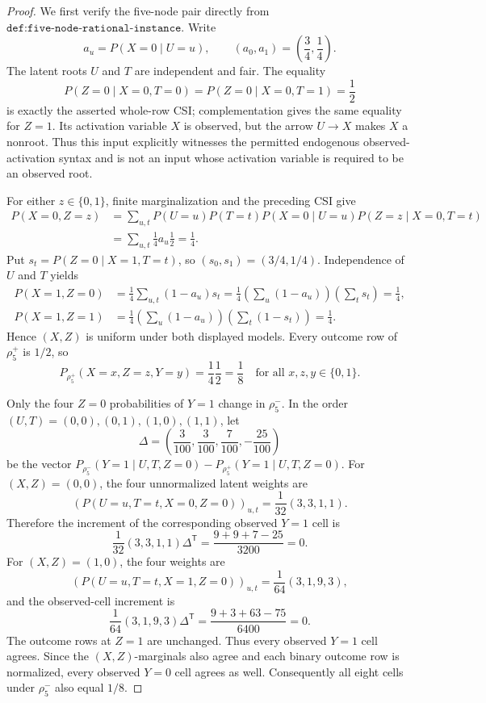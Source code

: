 \documentclass{article}
\begin{document}
\begin{proof}
We first verify the five-node pair directly from \(\texttt{def:five-node-rational-instance}\).  Write
\[
 a_u=P(X=0\mid U=u),\qquad (a_0,a_1)=\left(\frac34,\frac14\right).
\]
The latent roots \(U\) and \(T\) are independent and fair.  The equality
\[
 P(Z=0\mid X=0,T=0)=P(Z=0\mid X=0,T=1)=\frac12
\]
is exactly the asserted whole-row CSI; complementation gives the same equality for \(Z=1\).  Its activation variable \(X\) is observed, but the arrow \(U\to X\) makes \(X\) a nonroot.  Thus this input explicitly witnesses the permitted endogenous observed-activation syntax and is not an input whose activation variable is required to be an observed root.

For either \(z\in\{0,1\}\), finite marginalization and the preceding CSI give
\[
 \begin{aligned}
 P(X=0,Z=z)
 &=\sum_{u,t}P(U=u)P(T=t)P(X=0\mid U=u)P(Z=z\mid X=0,T=t)\\
 &=\sum_{u,t}\frac14 a_u\frac12
 =\frac14.
 \end{aligned}
\]
Put \(s_t=P(Z=0\mid X=1,T=t)\), so \((s_0,s_1)=(3/4,1/4)\).  Independence of \(U\) and \(T\) yields
\[
 \begin{aligned}
 P(X=1,Z=0)
 &=\frac14\sum_{u,t}(1-a_u)s_t
 =\frac14\left(\sum_u(1-a_u)\right)\left(\sum_t s_t\right)
 =\frac14,\\
 P(X=1,Z=1)
 &=\frac14\left(\sum_u(1-a_u)\right)\left(\sum_t(1-s_t)\right)
 =\frac14.
 \end{aligned}
\]
Hence \((X,Z)\) is uniform under both displayed models.  Every outcome row of \(\rho^+_5\) is \(1/2\), so
\[
 P_{\rho^+_5}(X=x,Z=z,Y=y)=\frac14\frac12=\frac18
 \quad\text{for all }x,z,y\in\{0,1\}.
\]

Only the four \(Z=0\) probabilities of \(Y=1\) change in \(\rho^-_5\).  In the order \((U,T)=(0,0),(0,1),(1,0),(1,1)\), let
\[
 \Delta=\left(\frac3{100},\frac3{100},\frac7{100},-\frac{25}{100}\right)
\]
be the vector \(P_{\rho^-_5}(Y=1\mid U,T,Z=0)-P_{\rho^+_5}(Y=1\mid U,T,Z=0)\).  For \((X,Z)=(0,0)\), the four unnormalized latent weights are
\[
 \left(P(U=u,T=t,X=0,Z=0)\right)_{u,t}
 =\frac1{32}(3,3,1,1).
\]
Therefore the increment of the corresponding observed \(Y=1\) cell is
\[
 \frac1{32}(3,3,1,1)\Delta^{\mathsf T}
 =\frac{9+9+7-25}{3200}=0.
\]
For \((X,Z)=(1,0)\), the four weights are
\[
 \left(P(U=u,T=t,X=1,Z=0)\right)_{u,t}
 =\frac1{64}(3,1,9,3),
\]
and the observed-cell increment is
\[
 \frac1{64}(3,1,9,3)\Delta^{\mathsf T}
 =\frac{9+3+63-75}{6400}=0.
\]
The outcome rows at \(Z=1\) are unchanged.  Thus every observed \(Y=1\) cell agrees.  Since the \((X,Z)\)-marginals also agree and each binary outcome row is normalized, every observed \(Y=0\) cell agrees as well.  Consequently all eight cells under \(\rho^-_5\) also equal \(1/8\).


\end{proof}
\end{document}
